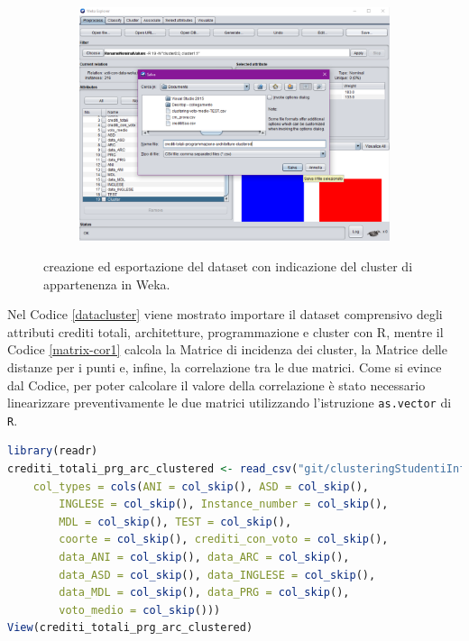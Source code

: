 \documentclass[12pt]{article}
\begin{document}
\begin{figure}
\begin{subfigure}[b]{0.4\textwidth}
	\end{subfigure}
	\begin{subfigure}[b]{0.4\textwidth}
	\includegraphics[width=\textwidth]{img/save-cluster-ass-4.pdf}
	\end{subfigure}
	\caption{creazione ed esportazione del dataset con indicazione del cluster di appartenenza in Weka.}
	\label{fig:add-cluster}
\end{figure}

Nel Codice \ref{datacluster} viene mostrato importare il dataset comprensivo degli attributi crediti totali, architetture, programmazione e cluster con R, mentre il Codice \ref{matrix-cor1} calcola la Matrice di incidenza dei cluster, la Matrice delle distanze per i punti e, infine, la correlazione tra le due matrici. Come si evince dal Codice, per poter calcolare il valore della correlazione è stato necessario linearizzare preventivamente le due matrici utilizzando l'istruzione \texttt{as.vector} di \texttt{R}.

\lstset{%
   breaklines=true
}

\begin{lstlisting}[caption={Importazione degli attributi crediti totali, architetture, programmazione e cluster.}, label={datacluster}, captionpos=b, language = R]
library(readr)
crediti_totali_prg_arc_clustered <- read_csv("git/clusteringStudentiInformatica/crediti_totali-prg-arc-clustered.csv", 
    col_types = cols(ANI = col_skip(), ASD = col_skip(), 
        INGLESE = col_skip(), Instance_number = col_skip(), 
        MDL = col_skip(), TEST = col_skip(), 
        coorte = col_skip(), crediti_con_voto = col_skip(), 
        data_ANI = col_skip(), data_ARC = col_skip(), 
        data_ASD = col_skip(), data_INGLESE = col_skip(), 
        data_MDL = col_skip(), data_PRG = col_skip(), 
        voto_medio = col_skip()))
View(crediti_totali_prg_arc_clustered)
\end{lstlisting}
\end{document}
